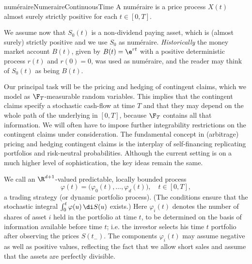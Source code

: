 \begin{defn}{num\'{e}raire}{NumeraireContinuousTime}
	A num\'{e}raire is a price process \(X(t)\) almost surely strictly positive for each \(t \in [0, T]\).
\end{defn}

We assume now that \(S_0(t)\) is a non-dividend paying asset, which is (almost surely) strictly positive and we use \(S_0\) as num\'{e}raire. \emph{Historically} the money market account \(B(t)\), given by \(B(t) = \e^{rt}\) with a positive deterministic process \(r(t)\) and \(r(0) = 0\), was used as num\'{e}raire, and the reader may think of \(S_0(t)\) as being \(B(t)\).

Our principal task will be the pricing and hedging of contingent claims, which we model as \(\F_T\)-measurable random variables. This implies that the contingent claims specify a stochastic cash-flow at time \(T\) and that they may depend on the whole path of the underlying in \([0,T]\), because \(\F_T\) contains all that information. We will often have to impose further integrability restrictions on the contingent claims under consideration. The fundamental concept in (arbitrage) pricing and hedging contingent claims is the interplay of self-financing replicating portfolios and risk-neutral probabilities. Although the current setting is on a much higher level of sophistication, the key ideas remain the same.

We call an \(\R^{d+1}\)-valued predictable, locally bounded process
\[
	\varphi(t) = \bigl(\varphi_0(t),\dots,\varphi_d(t)\bigr), \quad t \in [0,T],
\]
a trading strategy (or dynamic portfolio process). (The conditions ensure that the stochastic integral \(\int_{0}^{t} \varphi(u)\,\di S(u)\) exists.) Here \(\varphi_i(t)\) denotes the number of shares of asset \(i\) held in the portfolio at time \(t\), to be determined on the basis of information available before time \(t\); i.e. the investor selects his time \(t\) portfolio after observing the prices \(S(t_{-})\). The components \(\varphi_i(t)\) may assume negative as well as positive values, reflecting the fact that we allow short sales and assume that the assets are perfectly divisible.

